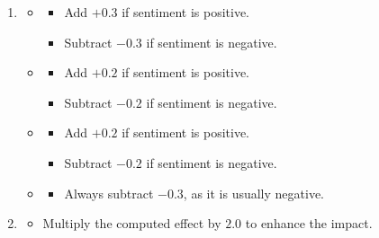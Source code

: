 \documentclass[3p,times,procedia]{elsarticle}
\begin{document}
\begin{enumerate}
    \item {}
    \begin{itemize}
        \item {} 
        \begin{itemize}
            \item Add $+0.3$ if sentiment is positive.
            \item Subtract $-0.3$ if sentiment is negative.
        \end{itemize}
        \item {}
        \begin{itemize}
            \item Add $+0.2$ if sentiment is positive.
            \item Subtract $-0.2$ if sentiment is negative.
        \end{itemize}
        \item {}
        \begin{itemize}
            \item Add $+0.2$ if sentiment is positive.
            \item Subtract $-0.2$ if sentiment is negative.
        \end{itemize}
        \item {}
        \begin{itemize}
            \item Always subtract $-0.3$, as it is usually negative.
        \end{itemize}
    \end{itemize}

    \item {}
    \begin{itemize}
        \item Multiply the computed effect by $2.0$ to enhance the impact.
    \end{itemize}
\end{enumerate}
 \cite{Ball1968}
\end{document}
